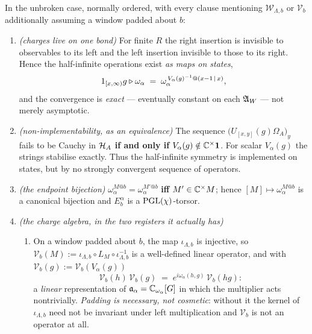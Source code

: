 \begin{theorem}
\label{thm:a1}
\statusProved\;
In the unbroken case, normally ordered, with every clause mentioning
$\mathcal{W}_{\Lambda,b}$ or $\mathcal{V}_b$ additionally assuming a window
padded about $b$:
\begin{enumerate}
\item[(a)] \emph{(charges live on one bond)} For finite $R$ the right insertion
  is invisible to observables to its left and the left insertion invisible to
  those to its right.  Hence the half-infinite operations exist \emph{as maps on
  states},
  \[
    1_{[x,\infty)}g \triangleright \omega_\alpha
    \;=\; \omega_\alpha^{\,V_\alpha(g)^{-1}@(x-1\,|\,x)},
  \]
  and the convergence is \emph{exact} --- eventually constant on each $\mathfrak{A}_W$
  --- not merely asymptotic.
\item[(b)] \emph{(non-implementability, as an equivalence)} The sequence
  $\bigl(U_{[x,y]}(g)\Omega_A\bigr)_y$ fails to be Cauchy in $\mathcal{H}_A$
  \textbf{if and only if} $V_\alpha(g)\notin\mathbb{C}^\times\mathbf{1}$.  For scalar
  $V_\alpha(g)$ the strings stabilise exactly.  Thus the half-infinite symmetry
  is implemented on states, but by no strongly convergent sequence of operators.
\item[(c)] \emph{(the endpoint bijection)}
  $\omega_\alpha^{M@b}=\omega_\alpha^{M'@b}$ \textbf{iff} $M'\in\mathbb{C}^\times M$;
  hence $[M]\mapsto\omega_\alpha^{M@b}$ is a canonical bijection and $E^\alpha_b$
  is a $\operatorname{PGL}(\chi)$-torsor.
\item[(d)] \emph{(the charge algebra, in the two registers it actually has)}
  \begin{enumerate}
  \item[(d1)] On a window padded about $b$, the map $\iota_{\Lambda,b}$ is
    injective, so
    $\mathcal{V}_b(M):=\iota_{\Lambda,b}\circ L_M\circ\iota_{\Lambda,b}^{-1}$ is a
    well-defined linear operator, and with $\mathcal{V}_b(g):=\mathcal{V}_b(V_\alpha(g))$
    \begin{equation}
      \mathcal{V}_b(h)\,\mathcal{V}_b(g)\;=\;e^{i\omega_\alpha(h,g)}\,\mathcal{V}_b(hg):
      \label{eq:twisted-rep}
    \end{equation}
    a \emph{linear} representation of $\mathfrak{a}_\alpha=\mathbb{C}_{\omega_\alpha}[G]$ in which
    the multiplier acts nontrivially.  \emph{Padding is necessary, not
    cosmetic}: without it the kernel of $\iota_{\Lambda,b}$ need not be invariant
    under left multiplication and $\mathcal{V}_b$ is not an operator at all.

\end{enumerate}
\end{enumerate}
\end{theorem}
